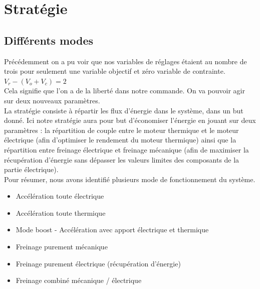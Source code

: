 \section{Stratégie}
\subsection{Différents modes}
Précédemment on a pu voir que nos variables de réglages étaient au nombre de trois pour seulement une variable objectif et zéro variable de contrainte.\\
$V_r - (V_o + V_c) = 2$ \\
Cela signifie que l'on a de la liberté dans notre commande. On va pouvoir agir sur deux nouveaux paramètres.\\

La stratégie consiste à répartir les flux d'énergie dans le système, dans un but donné. Ici notre stratégie aura pour but d'économiser l'énergie en jouant sur deux paramètres : la répartition de couple entre le moteur thermique et le moteur électrique (afin d'optimiser le rendement du moteur thermique) ainsi que la répartition entre freinage électrique et freinage mécanique (afin de maximiser la récupération d'énergie sans dépasser les valeurs limites des composants de la partie électrique).\\

Pour résumer, nous avons identifié plusieurs mode de fonctionnement du système.\\
\begin{itemize}
\item Accélération toute électrique
\item Accélération toute thermique
\item Mode boost - Accélération avec apport électrique et thermique
\item Freinage purement mécanique
\item Freinage purement électrique (récupération d'énergie)
\item Freinage combiné mécanique / électrique
\end{itemize}~\\

